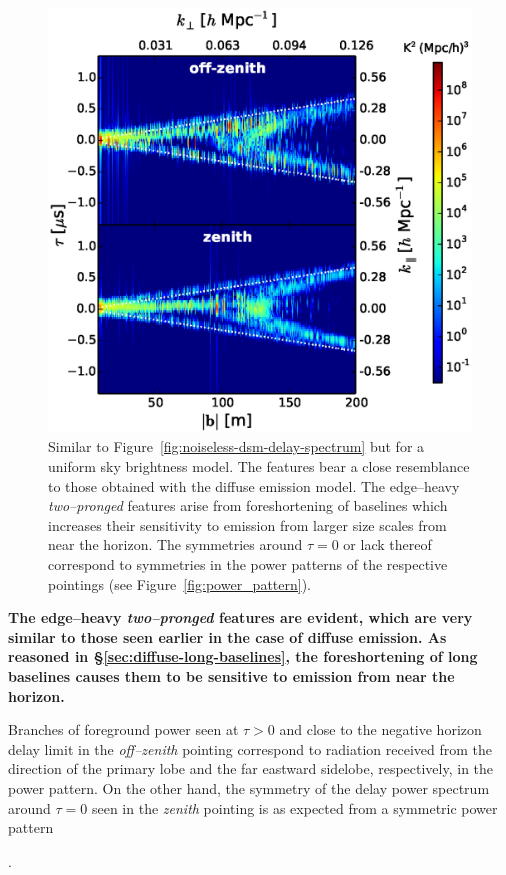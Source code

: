 \documentclass[preprint2,iop,numberedappendix]{emulateapj}
\begin{document}
\begin{figure}[htb]
\centering
\includegraphics[width=\linewidth]{fig15.eps}
\caption{Similar to Figure~\ref{fig:noiseless-dsm-delay-spectrum} but for a uniform sky brightness model. The features bear a close resemblance to those obtained with the diffuse emission model. The edge--heavy {\it two--pronged} features arise from foreshortening of baselines which increases their sensitivity to emission from larger size scales from near the horizon. The symmetries around $\tau=0$ or lack thereof correspond to symmetries in the power patterns of the respective pointings (see Figure~\ref{fig:power_pattern}). \label{fig:noiseless-usm-delay-spectrum}}
\end{figure}

{\bf The edge--heavy {\it two--pronged} features are evident, which are very similar to those seen earlier in the case of diffuse emission. As reasoned in \S\ref{sec:diffuse-long-baselines}, the foreshortening of long baselines causes them to be sensitive to emission from near the horizon. 

Branches of foreground power seen at $\tau>0$ and close to the negative horizon delay limit in the {\it off--zenith} pointing correspond to radiation received from the direction of the primary lobe and the far eastward sidelobe, respectively, in the power pattern. On the other hand, the symmetry of the delay power spectrum around $\tau=0$ seen in the {\it zenith} pointing is as expected from a symmetric power pattern}.
\end{document}

